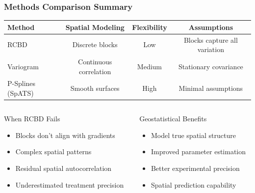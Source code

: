 \documentclass[aspectratio=43]{beamer}
\begin{document}
\begin{frame}
    \frametitle{Methods Comparison Summary}
    
    \begin{table}[h]
        \centering
        \scriptsize
        \begin{tabular}{|l|c|c|c|}
            \hline
            \rowcolor{lightblue}
            \textbf{Method} & \textbf{Spatial Modeling} & \textbf{Flexibility} & \textbf{Assumptions} \\
            \hline
            \rowcolor{lightgray}
            RCBD & Discrete blocks & Low & Blocks capture all variation \\
            \hline
            Variogram & Continuous correlation & Medium & Stationary covariance \\
            \hline
            \rowcolor{lightgray}
            P-Splines (SpATS) & Smooth surfaces & High & Minimal assumptions \\
            \hline
        \end{tabular}
    \end{table}
    
    \vspace{1em}
    
    \begin{columns}[T]
        \begin{column}{0.5\textwidth}
            \begin{block}{When RCBD Fails}
                \begin{itemize}
                    \item Blocks don't align with gradients
                    \item Complex spatial patterns
                    \item Residual spatial autocorrelation
                    \item Underestimated treatment precision
                \end{itemize}
            \end{block}
        \end{column}
        
        \begin{column}{0.5\textwidth}
            \begin{block}{Geostatistical Benefits}
                \begin{itemize}
                    \item Model true spatial structure
                    \item Improved parameter estimation
                    \item Better experimental precision
                    \item Spatial prediction capability
                \end{itemize}
            \end{block}
        \end{column}
    \end{columns}
    

\end{frame}
\end{document}
